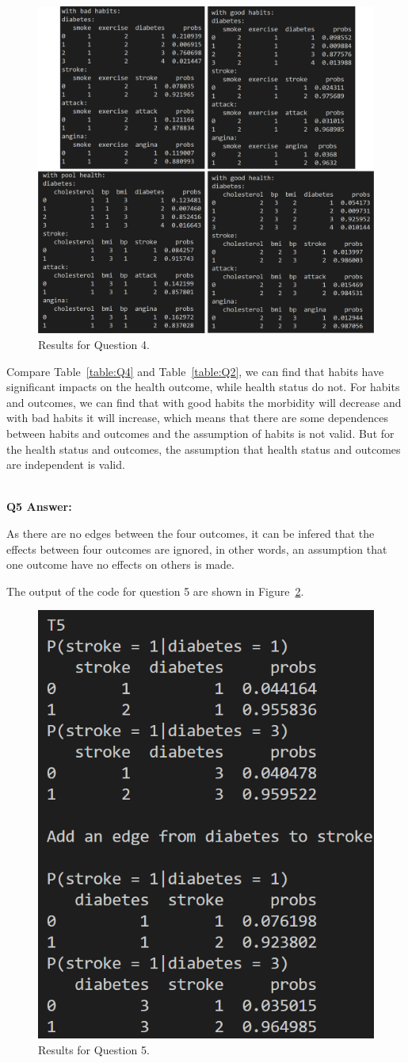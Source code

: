 \documentclass[aps,letterpaper,10pt]{revtex4}
\begin{document}
    
\begin{figure}[H]
    \centering
    \includegraphics[width=0.95\linewidth]{T4.jpg}
    \caption{Results for Question 4.}
    \label{fig:Q4}
\end{figure}

Compare Table~\ref{table:Q4} and Table~\ref{table:Q2}, we can find that habits have significant impacts on the health outcome, while health status do not. For habits and outcomes, we can find that with good habits the morbidity will decrease and with bad habits it will increase, which means that there are some dependences between habits and outcomes and the assumption of habits is not valid. But for the health status and outcomes, the assumption that health status and outcomes are independent is valid.

~\\
\textbf{Q5 Answer: }

As there are no edges between the four outcomes, it can be infered that the effects between four outcomes are ignored, in other words, an assumption that one outcome have no effects on others is made. 

The output of the code for question 5 are shown in Figure~\ref{fig:Q5}.

\begin{figure}[H]
    \centering
    \includegraphics[width=0.35\linewidth]{T5.png}
    \caption{Results for Question 5.}
    \label{fig:Q5}
\end{figure}
\end{document}
